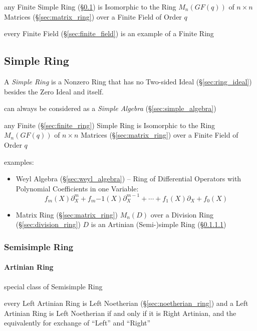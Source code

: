 any Finite Simple Ring (\S\ref{sec:simple_ring}) is Isomorphic to the Ring
$M_n(GF(q))$ of $n \times n$ Matrices (\S\ref{sec:matrix_ring}) over a Finite
Field of Order $q$

every Finite Field (\S\ref{sec:finite_field}) is an example of a Finite Ring



\subsection{Simple Ring}\label{sec:simple_ring}

A \emph{Simple Ring} is a Nonzero Ring that has no Two-sided Ideal
(\S\ref{sec:ring_ideal}) besides the Zero Ideal and itself.

can always be considered as a \emph{Simple Algebra} (\S\ref{sec:simple_algebra})

any Finite (\S\ref{sec:finite_ring}) Simple Ring is Isomorphic to the Ring
$M_n(GF(q))$ of $n \times n$ Matrices (\S\ref{sec:matrix_ring}) over a Finite
Field of Order $q$

examples:
\begin{itemize}
  \item Weyl Algebra (\S\ref{sec:weyl_algebra}) -- Ring of Differential
    Operators with Polynomial Coefficients in one Variable:\[
      f_m(X)\partial^m_X + f_m{-1}(X)\partial^{m-1}_X + \cdots +
      f_1(X)\partial_X + f_0(X)
    \]
  \item Matrix Ring (\S\ref{sec:matrix_ring}) $M_n(D)$ over a Division Ring
    (\S\ref{sec:division_ring}) $D$ is an Artinian (Semi-)simple Ring
    (\S\ref{sec:artinian_ring})
\end{itemize}



\subsubsection{Semisimple Ring}\label{sec:semisimple_ring}

\paragraph{Artinian Ring}\label{sec:artinian_ring}\hfill

special class of Semisimple Ring

every Left Artinian Ring is Left Noetherian (\S\ref{sec:noetherian_ring}) and a
Left Artinian Ring is Left Noetherian if and only if it is Right Artinian, and
the equivalently for exchange of ``Left'' and ``Right''



